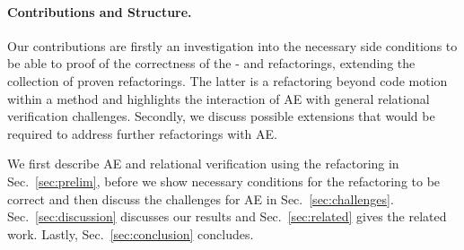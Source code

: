 \paragraph{Contributions and Structure.}
Our contributions are firstly an investigation into the necessary side conditions to be able to proof of the correctness of the - and  refactorings, extending the collection of proven refactorings.
The latter is a refactoring beyond code motion within a method and highlights the interaction of AE with general relational verification challenges.
Secondly, we discuss possible extensions that would be required to address further refactorings with AE.

We first describe AE and relational verification using the  refactoring in Sec.~\ref{sec:prelim}, before we show necessary conditions for the  refactoring to be correct  and then discuss the challenges for AE in Sec.~\ref{sec:challenges}. Sec.~\ref{sec:discussion} discusses our results and Sec.~\ref{sec:related} gives the related work. Lastly, Sec.~\ref{sec:conclusion} concludes.




